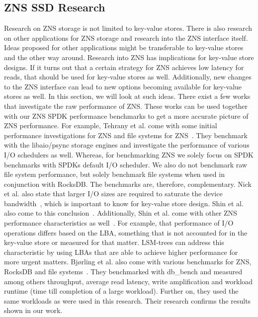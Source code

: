 \subsection{ZNS SSD Research}
Research on ZNS storage is not limited to key-value stores. There is also research on other applications for ZNS storage and research into the ZNS interface itself. Ideas proposed for other applications might be transferable to key-value stores and the other way around. Research into ZNS has implications for key-value store designs. If it turns out that a certain strategy for ZNS achieves low latency for reads, that should be used for key-value stores as well. Additionally, new changes to the ZNS interface can lead to new options becoming available for key-value stores as well. In this section, we will look at such ideas.  
There exist a few works that investigate the raw performance of ZNS. These works can be used together with our ZNS SPDK performance benchmarks to get a more accurate picture of ZNS performance. For example, Tehrany et al. come with some initial performance investigations for ZNS and file systems for ZNS~\cite{tehrany2022understanding}. They benchmark with the libaio/psync storage engines and investigate the performance of various I/O schedulers as well. Whereas, for benchmarking ZNS we solely focus on SPDK benchmarks with SPDKs default I/O scheduler. We also do not benchmark raw file system performance, but solely benchmark file systems when used in conjunction with RocksDB. The benchmarks are, therefore, complementary. Nick et al. also state that larger I/O sizes are required to saturate the device bandwidth~\cite{tehrany2022understanding}, which is important to know for key-value store design. Shin et al. also come to this conclusion~\cite{shin2020exploring}. Additionally, Shin et al. come with other ZNS performance characteristics as well~\cite{shin2020exploring}. For example, that performance of I/O operations differs based on the LBA, something that is not accounted for in the key-value store or measured for that matter. LSM-trees can address this characteristic by using LBAs that are able to achieve higher performance for more urgent matters. Bj{\o}rling et al. also come with various benchmarks for ZNS, RocksDB and file systems~\cite{bjorling2021zns}. They benchmarked with db\_bench and measured among others throughput, average read latency, write amplification and workload runtime (time till completion of a large workload). Further on, they used the same workloads as were used in this research. Their research confirms the results shown in our work.

